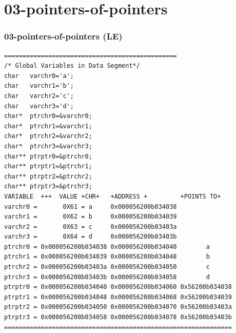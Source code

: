 \documentclass[aspectratio=169, xcolor=table, notheorems, hyperref={pdfpagelabels=false}]{beamer}
\begin{document}
\section{03-pointers-of-pointers}
\begin{frame}[fragile]
\frametitle{03-pointers-of-pointers (LE)}
\begin{lstlisting}[basicstyle=\ttfamily\tiny]  
===============================================
/* Global Variables in Data Segment*/
char   varchr0='a';
char   varchr1='b';
char   varchr2='c';
char   varchr3='d';
char*  ptrchr0=&varchr0;
char*  ptrchr1=&varchr1;
char*  ptrchr2=&varchr2;
char*  ptrchr3=&varchr3;
char** ptrptr0=&ptrchr0;
char** ptrptr1=&ptrchr1;
char** ptrptr2=&ptrchr2;
char** ptrptr3=&ptrchr3;
VARIABLE  +++  VALUE +CHR+   +ADDRESS +         +POINTS TO+ 
varchr0 =       0X61 = a     0x000056200b034038
varchr1 =       0X62 = b     0x000056200b034039
varchr2 =       0X63 = c     0x000056200b03403a
varchr3 =       0X64 = d     0x000056200b03403b
ptrchr0 = 0x000056200b034038 0x000056200b034040        a
ptrchr1 = 0x000056200b034039 0x000056200b034048        b
ptrchr2 = 0x000056200b03403a 0x000056200b034050        c
ptrchr3 = 0x000056200b03403b 0x000056200b034058        d
ptrptr0 = 0x000056200b034040 0x000056200b034060 0x56200b034038
ptrptr1 = 0x000056200b034048 0x000056200b034068 0x56200b034039
ptrptr2 = 0x000056200b034050 0x000056200b034070 0x56200b03403a
ptrptr3 = 0x000056200b034058 0x000056200b034078 0x56200b03403b
==============================================================
\end{lstlisting}

\end{frame}
\end{document}
